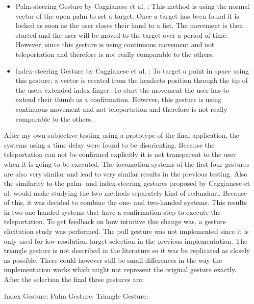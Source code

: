 \begin{itemize}
    \item Palm-steering Gesture by Caggianese et al. \cite{Caggianese}:
    This method is using the normal vector of the open palm to set a target. Once a target has been found it is locked as soon as the user closes their hand to a fist. The movement is then started and the user will be moved to the target over a period of time.
    However, since this gesture is using continuous movement and not teleportation and therefore is not really comparable to the others.
    
    \item Index-steering Gesture by Caggianese et al. \cite{Caggianese}:
    To target a point in space using this gesture, a vector is created from the headsets position through the tip of the users extended index finger. To start the movement the user has to extend their thumb as a confirmation.
    However, this gesture is using continuous movement and not teleportation and therefore is not really comparable to the others.
\end{itemize}

After my own subjective testing using a prototype of the final application, the systems using a time delay were found to be disorienting. Because the teleportation can not be confirmed explicitly it is not transparent to the user when it is going to be executed. The locomotion systems of the first four gestures are also very similar and lead to very similar results in the previous testing. Also the similarity to the palm- and index-steering gestures proposed by Caggianese et al. would make studying the two methods separately kind of redundant. Because of this, it was decided to combine the one- and two-handed systems. This results in two one-handed systems that have a confirmation step to execute the teleportation. To get feedback on how intuitive this change was, a gesture elicitation study was performed. The pull gesture was not implemented since it is only used for low-resolution target selection in the previous implementation. The triangle gesture is not described in the literature so it was be replicated as closely as possible. There could however still be small differences in the way the implementation works which might not represent the original gesture exactly. After the selection the final three gestures are:

Index Gesture: 
Palm Gesture:
Triangle Gesture:

